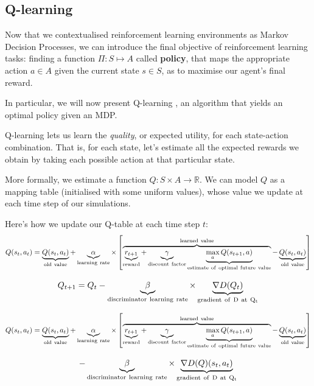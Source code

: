 \subsection{Q-learning}
\label{qlearning}
Now that we contextualised reinforcement learning environments as Markov Decision Processes, we can introduce the final objective of reinforcement learning tasks: finding a function $\Pi:S\mapsto A$ called \textbf{policy}, that maps the appropriate action $a\in A$ given the current state $s\in S$, as to maximise our agent's final reward.

In particular, we will now present Q-learning \parencite{watkins1992q}, an algorithm that yields an optimal policy given an MDP.

Q-learning lets us learn the \emph{quality}, or expected utility, for each state-action combination. That is, for each state, let's estimate all the expected rewards we obtain by taking each possible action at that particular state.

More formally, we estimate a function $Q: S \times A \to \mathbb{R}$. We can model $Q$ as a mapping table (initialised with some uniform values), whose value we update at each time step of our simulations.


Here's how we update our Q-table at each time step $t$:
  \[Q(s_{t},a_{t}) = \underbrace{Q(s_t,a_t)}_{\rm old~value} +
  \underbrace{\alpha}_{\rm learning~rate} \times \left[
    \overbrace{\underbrace{r_{t+1}}_{\rm reward} + \underbrace{\gamma}_{\rm
        discount~factor} \underbrace{\max_{a}Q(s_{t+1}, a)}_{\rm
        estimate~of~optimal~future~value}}^{\rm learned~value} -
    \underbrace{Q(s_t,a_t)}_{\rm old~value} \right] \]

\[Q_{t+1} = Q_{t}-\underbrace{\beta}_{\rm discriminator~learning~rate} \times \underbrace{\nabla D(Q_{t})}_{\rm gradient~of~D~at~Q_{t}}\]

  \[Q(s_{t},a_{t}) = \underbrace{Q(s_t,a_t)}_{\rm old~value} +
  \underbrace{\alpha}_{\rm learning~rate} \times \left[
    \overbrace{\underbrace{r_{t+1}}_{\rm reward} + \underbrace{\gamma}_{\rm
        discount~factor} \underbrace{\max_{a}Q(s_{t+1}, a)}_{\rm
        estimate~of~optimal~future~value}}^{\rm learned~value} -
    \underbrace{Q(s_t,a_t)}_{\rm old~value} \right]\]
    
    \[- \underbrace{\beta}_{\rm discriminator~learning~rate} \times \underbrace{\nabla D(Q)(s_{t}, a_{t})}_{\rm gradient~of~D~at~Q_{t}} \]
   
